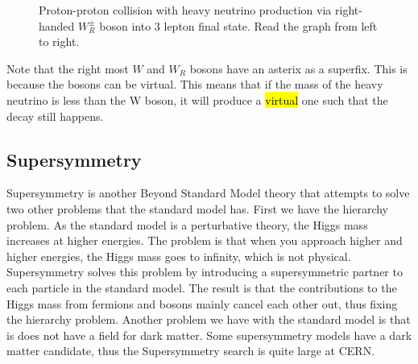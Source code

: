 \begin{figure}[H]
    \centering
    
    \caption[Heavy neutrino signal diagram, right-handed W]{Proton-proton collision with heavy neutrino production via right-handed $W_R^{\pm}$ boson into 3 lepton final state. Read the graph from left to right.}
    \label{fig:Target_model_2}
    \end{figure}

Note that the right most $W$ and $W_R$ bosons have an asterix as a superfix. This is because 
the bosons can be virtual. This means that if the mass of the heavy neutrino is less than the W boson,
it will produce a \hl{virtual} one such that the decay still happens. 

\subsection*{Supersymmetry}
Supersymmetry is another Beyond Standard Model theory that attempts to solve two other problems that the standard model has. 
First we have the hierarchy problem. As the standard model is a perturbative theory, the Higgs mass increases at 
higher energies. The problem is that when you approach higher and higher energies, the Higgs mass goes to infinity, 
which is not physical. Supersymmetry solves this problem by introducing a supersymmetric partner to each particle
in the standard model. The result is that the contributions to the Higgs mass from fermions and bosons mainly cancel each other out, 
thus fixing the hierarchy problem. Another problem we have with the standard model
is that is does not have a field for dark matter. Some supersymmetry models have a dark matter candidate, 
thus the Supersymmetry search is quite large at CERN. 